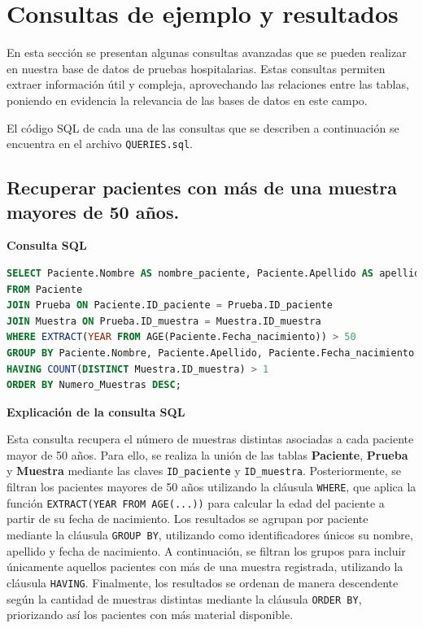 \documentclass[spanish]{article}
\begin{document}
\newpage
\section{Consultas de ejemplo y resultados}
En esta sección se presentan algunas consultas avanzadas que se pueden realizar en nuestra base de datos de pruebas hospitalarias. Estas consultas permiten extraer información útil y compleja, aprovechando las relaciones entre las tablas, poniendo en evidencia la relevancia de las bases de datos en este campo. 

El código SQL de cada una de las consultas que se describen a continuación se encuentra en el archivo \texttt{QUERIES.sql}.



\subsection{Recuperar pacientes con más de una muestra mayores de 50 años.}

\textbf{Consulta SQL}
\begin{lstlisting}[language=SQL]
SELECT Paciente.Nombre AS nombre_paciente, Paciente.Apellido AS apellido_paciente, EXTRACT(YEAR FROM AGE(Paciente.Fecha_nacimiento)) AS edad, COUNT(DISTINCT Muestra.ID_muestra) AS Numero_Muestras
FROM Paciente
JOIN Prueba ON Paciente.ID_paciente = Prueba.ID_paciente
JOIN Muestra ON Prueba.ID_muestra = Muestra.ID_muestra
WHERE EXTRACT(YEAR FROM AGE(Paciente.Fecha_nacimiento)) > 50
GROUP BY Paciente.Nombre, Paciente.Apellido, Paciente.Fecha_nacimiento
HAVING COUNT(DISTINCT Muestra.ID_muestra) > 1
ORDER BY Numero_Muestras DESC;
\end{lstlisting}

\textbf{Explicación de la consulta SQL}

Esta consulta recupera el número de muestras distintas asociadas a cada paciente mayor de 50 años. Para ello, se realiza la unión de las tablas \textbf{Paciente}, \textbf{Prueba} y \textbf{Muestra} mediante las claves \texttt{ID\_paciente} y \texttt{ID\_muestra}. Posteriormente, se filtran los pacientes mayores de 50 años utilizando la cláusula \texttt{WHERE}, que aplica la función \texttt{EXTRACT(YEAR FROM AGE(...))} para calcular la edad del paciente a partir de su fecha de nacimiento. Los resultados se agrupan por paciente mediante la cláusula \texttt{GROUP BY}, utilizando como identificadores únicos su nombre, apellido y fecha de nacimiento. A continuación, se filtran los grupos para incluir únicamente aquellos pacientes con más de una muestra registrada, utilizando la cláusula \texttt{HAVING}. Finalmente, los resultados se ordenan de manera descendente según la cantidad de muestras distintas mediante la cláusula \texttt{ORDER BY}, priorizando así los pacientes con más material disponible.
\end{document}

